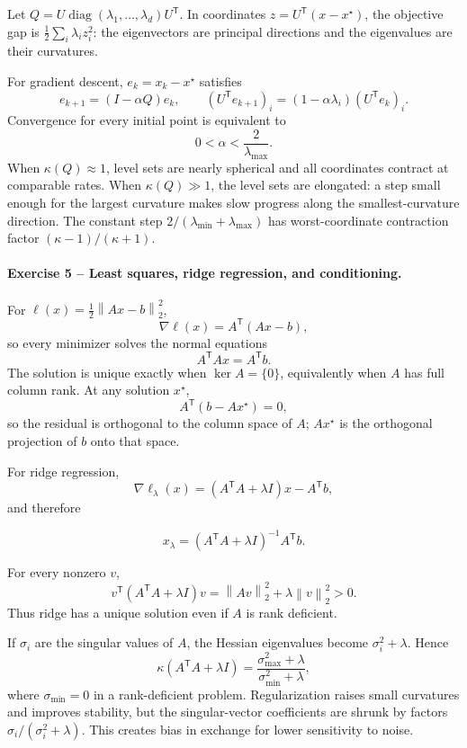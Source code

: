 \documentclass[10pt]{article}
\newcommand{\trans}{^{\mathsf T}}
\newcommand{\norm}[1]{\left\lVert#1\right\rVert}
\newcommand{\diag}{\operatorname{diag}}
\begin{document}
Let \(Q=U\diag(\lambda_1,\ldots,\lambda_d)U\trans\). In coordinates
\(z=U\trans(x-x^\star)\), the objective gap is
\(\frac12\sum_i\lambda_i z_i^2\): the eigenvectors are principal directions
and the eigenvalues are their curvatures.

For gradient descent, \(e_k=x_k-x^\star\) satisfies
\[
e_{k+1}=(I-\alpha Q)e_k,
\qquad
(U\trans e_{k+1})_i=(1-\alpha\lambda_i)(U\trans e_k)_i.
\]
Convergence for every initial point is equivalent to
\[
0<\alpha<\frac{2}{\lambda_{\max}}.
\]
When \(\kappa(Q)\approx1\), level sets are nearly spherical and all
coordinates contract at comparable rates. When \(\kappa(Q)\gg1\), the level
sets are elongated: a step small enough for the largest curvature makes slow
progress along the smallest-curvature direction. The constant step
\(2/(\lambda_{\min}+\lambda_{\max})\) has worst-coordinate contraction factor
\((\kappa-1)/(\kappa+1)\).

\paragraph{Exercise 5 -- Least squares, ridge regression, and conditioning.}

For
\(\ell(x)=\frac12\norm{Ax-b}_2^2\),
\[
\nabla\ell(x)=A\trans(Ax-b),
\]
so every minimizer solves the normal equations
\[
A\trans A x=A\trans b.
\]
The solution is unique exactly when \(\ker A=\{0\}\), equivalently when \(A\)
has full column rank. At any solution \(x^\star\),
\[
A\trans(b-Ax^\star)=0,
\]
so the residual is orthogonal to the column space of \(A\); \(Ax^\star\) is
the orthogonal projection of \(b\) onto that space.

For ridge regression,
\[
\nabla\ell_\lambda(x)
=(A\trans A+\lambda I)x-A\trans b,
\]
and therefore
\begin{resultbox}
\[
x_\lambda=(A\trans A+\lambda I)^{-1}A\trans b.
\]
\end{resultbox}
For every nonzero \(v\),
\[
v\trans(A\trans A+\lambda I)v
=\norm{Av}_2^2+\lambda\norm v_2^2>0.
\]
Thus ridge has a unique solution even if \(A\) is rank deficient.

If \(\sigma_i\) are the singular values of \(A\), the Hessian eigenvalues
become \(\sigma_i^2+\lambda\). Hence
\[
\kappa(A\trans A+\lambda I)
=\frac{\sigma_{\max}^2+\lambda}{\sigma_{\min}^2+\lambda},
\]
where \(\sigma_{\min}=0\) in a rank-deficient problem. Regularization raises
small curvatures and improves stability, but the singular-vector coefficients
are shrunk by factors \(\sigma_i/(\sigma_i^2+\lambda)\). This creates bias in
exchange for lower sensitivity to noise.
\end{document}
